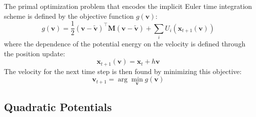 \documentclass{article}
\begin{document}
The primal optimization problem that encodes the implicit Euler time integration scheme is defined by the objective function $g(\mathbf{v})$:
\begin{equation}
    g(\mathbf{v}) = \frac{1}{2}(\mathbf{v} - \tilde{\mathbf{v}})^\top \mathbf{M} (\mathbf{v} - \tilde{\mathbf{v}}) + \sum_i U_i(\mathbf{x}_{t+1}(\mathbf{v}))
\end{equation}
where the dependence of the potential energy on the velocity is defined through the position update:
\begin{equation}
    \mathbf{x}_{t+1}(\mathbf{v}) = \mathbf{x}_t + h \mathbf{v}
\end{equation}
The velocity for the next time step is then found by minimizing this objective:
\begin{equation}
    \mathbf{v}_{t+1} = \arg \min_{\mathbf{v}} g(\mathbf{v})
\end{equation}

\subsection{Quadratic Potentials}
\end{document}
